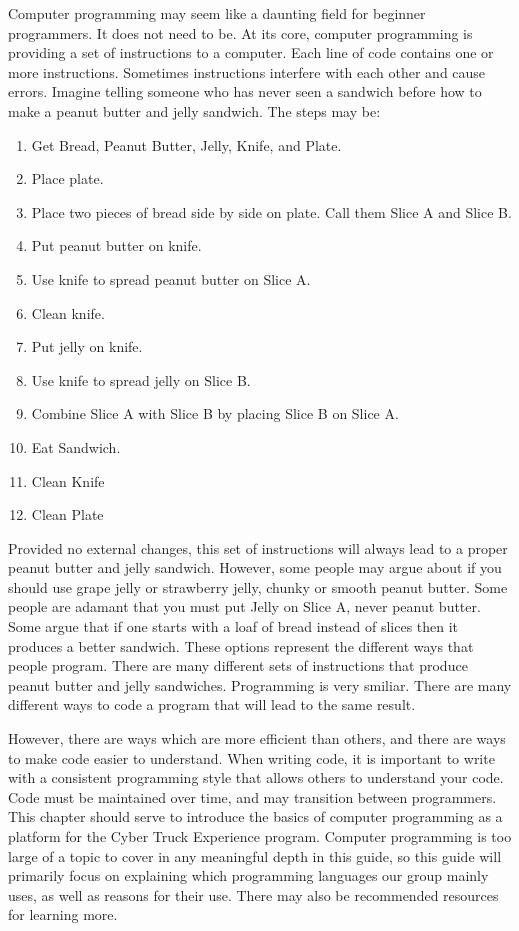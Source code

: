 Computer programming may seem like a daunting field for beginner programmers. It does not need to be. At its core, computer programming is providing a set of instructions to a computer. Each line of code contains one or more instructions. Sometimes instructions interfere with each other and cause errors. Imagine telling someone who has never seen a sandwich before how to make a peanut butter and jelly sandwich. The steps may be:
\begin{enumerate}
	\item Get Bread, Peanut Butter, Jelly, Knife, and Plate.
	\item Place plate.
	\item Place two pieces of bread side by side on plate. Call them Slice A and Slice B.
	\item Put peanut butter on knife.
	\item Use knife to spread peanut butter on Slice A.
	\item Clean knife.
	\item Put jelly on knife.
	\item Use knife to spread jelly on Slice B.
	\item Combine Slice A with Slice B by placing Slice B on Slice A.
	\item Eat Sandwich.
	\item Clean Knife
	\item Clean Plate
\end{enumerate}

Provided no external changes, this set of instructions will always lead to a proper peanut butter and jelly sandwich. However, some people may argue about if you should use grape jelly or strawberry jelly, chunky or smooth peanut butter. Some people are adamant that you must put Jelly on Slice A, never peanut butter. Some argue that if one starts with a loaf of bread instead of slices then it produces a better sandwich. These options represent the different ways that people program. There are many different sets of instructions that produce peanut butter and jelly sandwiches. Programming is very smiliar. There are many different ways to code a program that will lead to the same result.

However, there are ways which are more efficient than others, and there are ways to make code easier to understand. When writing code, it is important to write with a consistent programming style that allows others to understand your code. Code must be maintained over time, and may transition between programmers. This chapter should serve to introduce the basics of computer programming as a platform for the Cyber Truck Experience program. Computer programming is too large of a topic to cover in any meaningful depth in this guide, so this guide will primarily focus on explaining which programming languages our group mainly uses, as well as reasons for their use. There may also be recommended resources for learning more.


